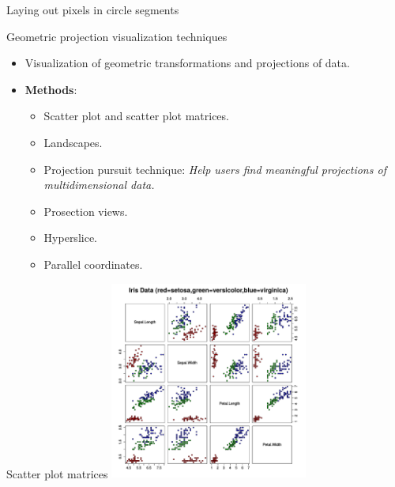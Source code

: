 \documentclass[aspectratio=169,t]{beamer}
\begin{document}
{\begin{frame}{Laying out pixels in circle segments}
    \end{frame}
  }

  { 
    \begin{frame}{Geometric projection visualization techniques}
    \begin{itemize}
      \item Visualization of geometric transformations and projections of data.
      \item \textbf{Methods}:
      \begin{itemize}
          \item Scatter plot and scatter plot matrices.
          \item Landscapes.
          \item Projection pursuit technique: \emph{Help users find meaningful projections of multidimensional data.}
          \item Prosection views.
          \item Hyperslice.
          \item Parallel coordinates.
      \end{itemize}
    \end{itemize}
    \end{frame}
  }

  { 
    \begin{frame}{Scatter plot matrices}
    \centering
    \includegraphics[height=6.5cm]{img/scatterplot_matrix.pdf}
    \end{frame}
  }
\end{document}

